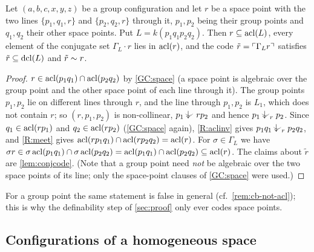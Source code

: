\begin{lemma}\label{lem:conjset-gc}
Let $(a,b,c,x,y,z)$ be a group configuration and let $r$ be a space point with the two
lines $\{p_1,q_1,r\}$ and $\{p_2,q_2,r\}$ through it, $p_1,p_2$ being their group points
and $q_1,q_2$ their other space points.  Put $L=k(p_1q_1p_2q_2)$.  Then
$r\subseteq\operatorname{acl}(L)$, every element of the conjugate set $\Gamma_L\cdot r$ lies in
$\operatorname{acl}(r)$, and the code $\tilde r=\ulcorner \Gamma_L r\urcorner$ satisfies $\tilde r\subseteq\operatorname{dcl}(L)$
and $\tilde r\sim r$.
\end{lemma}
\begin{proof}
$r\in\operatorname{acl}(p_1q_1)\cap\operatorname{acl}(p_2q_2)$ by \ref{GC:space} (a space point is algebraic over
the group point and the other space point of each line through it).  The group points
$p_1,p_2$ lie on different lines through $r$, and the line through $p_1,p_2$ is $L_1$,
which does not contain $r$; so $(r,p_1,p_2)$ is non-collinear, $p_1\ind{}rp_2$ and hence
$p_1\ind{r}p_2$.  Since $q_1\in\operatorname{acl}(rp_1)$ and $q_2\in\operatorname{acl}(rp_2)$ (\ref{GC:space} again),
\ref{R:aclinv} gives $p_1q_1\ind{r}p_2q_2$, and \ref{R:meet} gives
$\operatorname{acl}(rp_1q_1)\cap\operatorname{acl}(rp_2q_2)=\operatorname{acl}(r)$.  For $\sigma\in\Gamma_L$ we have
$\sigma r\in\sigma\operatorname{acl}(p_1q_1)\cap\sigma\operatorname{acl}(p_2q_2)=\operatorname{acl}(p_1q_1)\cap\operatorname{acl}(p_2q_2)\subseteq\operatorname{acl}(r)$.
The claims about $\tilde r$ are \cref{lem:conjcode}.  (Note that a group point need
\emph{not} be algebraic over the two space points of its line; only the space-point
clauses of \ref{GC:space} were used.)
\end{proof}

\begin{remark}
For a group point the same statement is false in general (cf.\ \cref{rem:cb-not-acl});
this is why the definability step of \cref{sec:proof} only ever codes space points.
\end{remark}

\subsection{Configurations of a homogeneous space}

